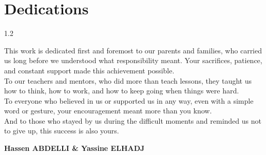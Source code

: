 \chapter*{Dedications}

\begin{spacing}{1.2}

This work is dedicated first and foremost to our parents and families, who carried us long before we understood what responsibility meant. Your sacrifices, patience, and constant support made this achievement possible.\\

To our teachers and mentors, who did more than teach lessons, they taught us how to think, how to work, and how to keep going when things were hard.\\

To everyone who believed in us or supported us in any way, even with a simple word or gesture, your encouragement meant more than you know.\\

And to those who stayed by us during the difficult moments and reminded us not to give up, this success is also yours.

\begin{flushright}
\textbf{Hassen ABDELLI \& Yassine ELHADJ}
\end{flushright}

\end{spacing}
